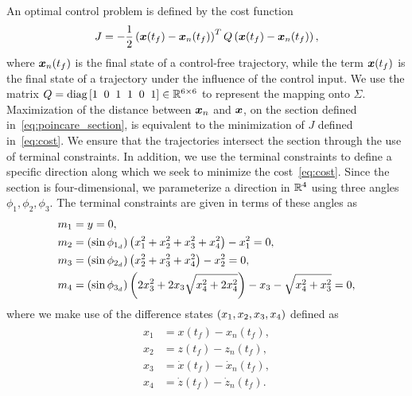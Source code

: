 \documentclass[]{aiaa-tc}%
\begin{document}
An optimal control problem is defined by the cost function
\begin{align}\label{eq:cost}
    J = -\frac{1}{2} \left( \bm{x}(t_f) - \bm{x}_{n}(t_f)\right)^T 
    Q
    \left( \bm{x}(t_f) - \bm{x}_{n}(t_f)\right) ,
\end{align}
where \( \bm{x}_n(t_f) \) is the final state of a control-free trajectory, while the term \( \bm{x}(t_f)\) is the final state of a trajectory under the influence of the control input.
We use the matrix \( Q = \text{diag} \left[ 1~\>0~\> 1~\> 1~\>0~\>1  \right] \in \mathbb{R}^{6 \times 6}\) to represent the mapping onto \( \Sigma \).
Maximization of the distance between \( \bm{x}_n \) and \(\bm{x} \), on the \Poincare section defined in~\cref{eq:poincare_section}, is equivalent to the minimization of \( J \) defined in~\cref{eq:cost}.
We ensure that the trajectories intersect the \Poincare section through the use of terminal constraints.
In addition, we use the terminal constraints to define a specific direction along which we seek to minimize the cost~\cref{eq:cost}.
Since the \Poincare section is four-dimensional, we parameterize a direction in \( \mathbb{R}^4 \)  using three angles \( \phi_1, \phi_2 , \phi_3 \).
The terminal constraints are given in terms of these angles as
\begin{align}\label{eq:terminal_constraints}
    \begin{split}
        m_1 &= y = 0 , \\
        m_2 &= \left( \sin \phi_{1_{d}} \right) \left(  x_1^2 + x_2^2 + x_3^2 + x_4^2 \right) - x_1^2 = 0, \\
        m_3 &= \left( \sin \phi_{2_{d}} \right) \left(  x_2^2 + x_3^2 + x_4^2 \right) - x_2^2 = 0, \\
        m_4 &= \left( \sin \phi_{3_{d}} \right) \left(  2 x_3^2 + 2 x_3 \sqrt{x_4^2 + 2 x_4^2} \right) - x_3 - \sqrt{x_4^2 + x_3^2} = 0 ,
    \end{split}
\end{align}
where we make use of the difference states \( \left( x_1, x_2 ,x_3, x_4  \right)\) defined as
\begin{align}\label{eq:diff_states}
    \begin{split}
        x_1 &= x(t_f) - x_n(t_f) , \\
        x_2 &= z(t_f) - z_n(t_f) , \\
        x_3 &= \dot{x}(t_f) - \dot{x}_n(t_f) , \\
        x_4 &= \dot{z}(t_f) - \dot{z}_n(t_f) . \\
    \end{split}
\end{align}
\end{document}
